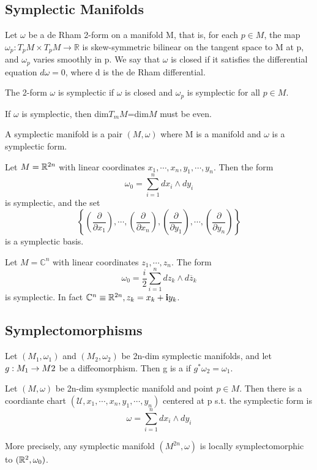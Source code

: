 \documentclass[4paper]{article}
\begin{document}
\subsection{Symplectic Manifolds}
Let $\omega$ be a de Rham 2-form on a manifold M, that is, for each $p\in M$, the map $\omega_p:T_pM
\times T_pM\rightarrow \mathbb{R}$ is skew-symmetric bilinear on the tangent space to M at p, and
$\omega_p$ varies smoothly in p. We say that $\omega$ is closed if it satisfies the differential
equation $d\omega=0$, where d is the de Rham differential.
\begin{definition}
The 2-form $\omega$ is symplectic if $\omega$ is closed and $\omega_p$ is symplectic for all $p\in M$.
\end{definition}
If $\omega$ is symplectic, then dim$T_mM$=dim$M$ must be even.
\begin{definition}
A symplectic manifold is a pair $(M,\omega)$ where M is a manifold and $\omega$ is a symplectic form.
\end{definition}
\begin{example}
Let $M=\mathbb{R}^{2n}$ with linear coordinates $x_1,\cdots,x_n,y_1,\cdots,y_n$. Then the form $$\omega_0 =
\sum_{i=1}^{n}dx_i\wedge dy_i$$ is symplectic, and the set $$\left\{\left(\frac{\partial}{\partial x_1}\right),
\cdots,\left(\frac{\partial}{\partial x_n}\right),\left(\frac{\partial}{\partial y_1}\right),\cdots,
\left(\frac{\partial}{\partial y_n}\right)\right\}$$ is a symplectic basis.
\end{example}
\begin{example}
Let $M=\mathbb{C}^n$ with linear coordinates $z_1,\cdots,z_n$. The form $$\omega_0=\frac{i}{2}\sum_{i=1}^{n}
dz_k\wedge d\overline{z}_k$$ is symplectic. In fact $\mathbb{C}^n\equiv\mathbb{R}^{2n},z_k=x_k+\textbf{i}y_k$.
\end{example}
\subsection{Symplectomorphisms}
\begin{definition}
Let $(M_1,\omega_1)$ and $(M_2,\omega_2)$ be 2n-dim symplectic manifolds, and let ${g}:{M_1}\rightarrow{M2}$
be a diffeomorphism. Then g is a  if $g^*\omega_2=\omega_1$.
\end{definition}
\begin{thm}[Darboux]
Let $(M,\omega)$ be 2n-dim sysmplectic manifold and point $p\in M$. Then there is a coordiante chart
$(\mathcal{U},x_1,\cdots,x_n,y_1,\cdots,y_n)$ centered at p s.t. the symplectic form is $$\omega=
\sum_{i=1}^{n}dx_i\wedge dy_i $$
\end{thm}
More precisely, any symplectic manifold $(M^{2n},\omega)$ is locally symplectomorphic to $(\mathbb{R}^{2},\omega_0)$.
\end{document}
